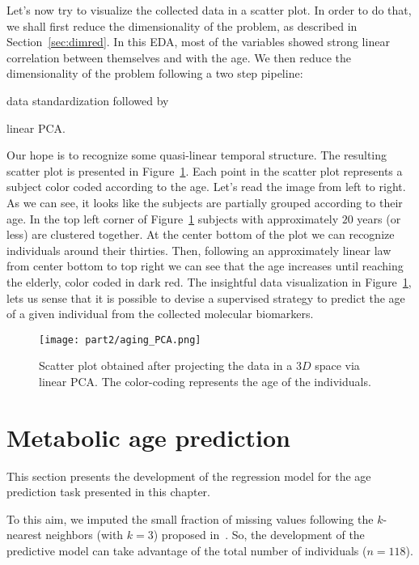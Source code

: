 Let's now try to visualize the collected data in a scatter plot. In order to do that, we shall first reduce the dimensionality of the problem, as described in Section~\ref{sec:dimred}.
In this EDA, most of the variables showed strong linear correlation between themselves and with the age. We then reduce the dimensionality of the problem following a two step pipeline:
\begin{enumerate*}[label=(\roman*)]
	\item data standardization followed by
	\item linear PCA.
\end{enumerate*}
Our hope is to recognize some quasi-linear temporal structure. The resulting scatter plot is presented in Figure~\ref{fig:frassoni_PCA}.
Each point in the scatter plot represents a subject color coded according to the age.
Let's read the image from left to right.
As we can see, it looks like the subjects are partially grouped according to their age. In the top left corner of Figure~\ref{fig:frassoni_PCA} subjects with approximately $20$ years (or less) are clustered together. At the center bottom of the plot we can recognize individuals around their thirties. Then, following an approximately linear law from center bottom to top right we can see that the age increases until reaching the elderly, color coded in dark red.
The insightful data visualization in Figure~\ref{fig:frassoni_PCA}, lets us sense that it is possible to devise a supervised strategy to predict the age of a given individual from the collected molecular biomarkers.

\begin{figure}[]
	\centering
	\texttt{[image: part2/aging\_PCA.png]}
	\caption{Scatter plot obtained after projecting the data in a $3D$ space via linear PCA. The color-coding represents the age of the individuals.} \label{fig:frassoni_PCA}
\end{figure}


\section{Metabolic age prediction} \label{sec:frassoni_regression}
This section presents the development of the regression model for the age prediction task presented in this chapter.

To this aim, we imputed the small fraction of missing values following the $k$-nearest neighbors (with $k=3$) proposed in~\cite{troyanskaya2001missing}. So, the development of the predictive model can take advantage of the total number of individuals ($n=118$).

